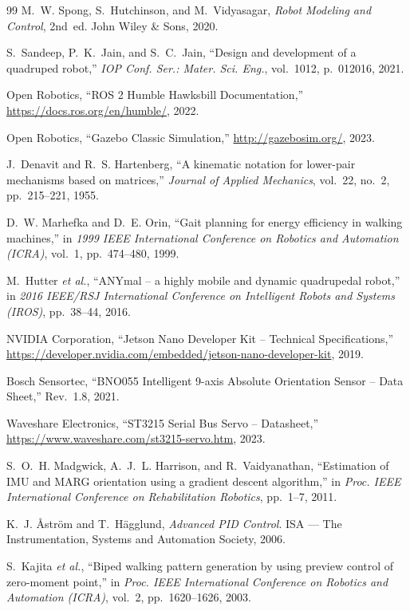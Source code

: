 \documentclass[13pt,a4paper,oneside]{extbook}
\begin{document}
\begin{thebibliography}{99}
M.~W. Spong, S.~Hutchinson, and M.~Vidyasagar,
\textit{Robot Modeling and Control}, 2nd~ed.
John Wiley \& Sons, 2020.

S.~Sandeep, P.~K.~Jain, and S.~C.~Jain,
``Design and development of a quadruped robot,''
\textit{IOP Conf. Ser.: Mater. Sci. Eng.}, vol.~1012, p.~012016, 2021.

Open Robotics,
``ROS 2 Humble Hawksbill Documentation,''
\url{https://docs.ros.org/en/humble/}, 2022.

Open Robotics,
``Gazebo Classic Simulation,''
\url{http://gazebosim.org/}, 2023.

J.~Denavit and R.~S. Hartenberg,
``A kinematic notation for lower-pair mechanisms based on matrices,''
\textit{Journal of Applied Mechanics}, vol.~22, no.~2, pp.~215--221, 1955.

D.~W. Marhefka and D.~E. Orin,
``Gait planning for energy efficiency in walking machines,''
in \textit{1999 IEEE International Conference on Robotics and Automation (ICRA)}, vol.~1, pp.~474--480, 1999.

M.~Hutter \textit{et al.},
``ANYmal -- a highly mobile and dynamic quadrupedal robot,''
in \textit{2016 IEEE/RSJ International Conference on Intelligent Robots and Systems (IROS)}, pp.~38--44, 2016.

NVIDIA Corporation,
``Jetson Nano Developer Kit -- Technical Specifications,''
\url{https://developer.nvidia.com/embedded/jetson-nano-developer-kit}, 2019.

Bosch Sensortec,
``BNO055 Intelligent 9-axis Absolute Orientation Sensor -- Data Sheet,''
Rev.~1.8, 2021.

Waveshare Electronics,
``ST3215 Serial Bus Servo -- Datasheet,''
\url{https://www.waveshare.com/st3215-servo.htm}, 2023.

S.~O.~H. Madgwick, A.~J.~L. Harrison, and R.~Vaidyanathan,
``Estimation of IMU and MARG orientation using a gradient descent algorithm,''
in \textit{Proc. IEEE International Conference on Rehabilitation Robotics}, pp.~1--7, 2011.

K.~J. \AA{}str\"{o}m and T.~H\"{a}gglund,
\textit{Advanced PID Control}.
ISA --- The Instrumentation, Systems and Automation Society, 2006.

S.~Kajita \textit{et al.},
``Biped walking pattern generation by using preview control of zero-moment point,''
in \textit{Proc. IEEE International Conference on Robotics and Automation (ICRA)}, vol.~2, pp.~1620--1626, 2003.


\end{thebibliography}
\end{document}
